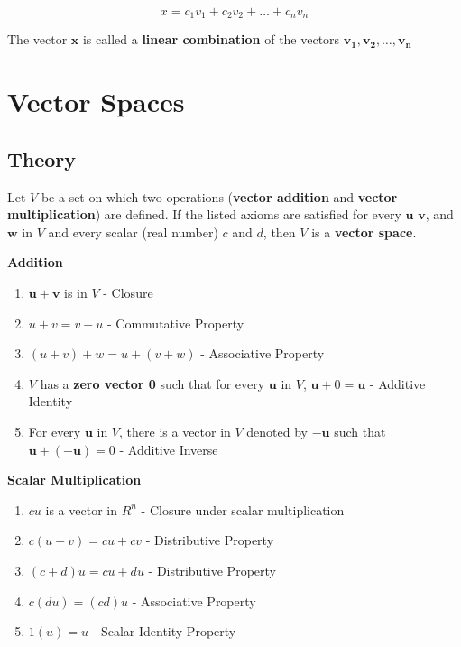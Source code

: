 \documentclass{report}
\begin{document}
$$
x = c_1v_1 + c_2v_2 + \hdots + c_nv_n
$$

\noindent The vector $\bm{x}$ is called a \textbf{linear combination} of the vectors $\bm{v_1},\bm{v_2},\hdots,\bm{v_n}$

\section{Vector Spaces} 

\subsection{Theory}

\begin{tcolorbox}[title = Definition of a Vector Space]
	
Let $V$ be a set on which two operations (\textbf{vector addition} and \textbf{vector multiplication}) are defined. If the listed axioms are satisfied for every $\bm{u}$ $\bm{v}$, and $\bm{w}$ in $V$ and every scalar (real number) $c$ and $d$, then $V$ is a \textbf{vector space}.\\

\end{tcolorbox}

\noindent \textbf{Addition}
\begin{enumerate} 
    \item $\bm{u} + \bm{v}$ is in $V$ - Closure
    \item $u+v=v+u$ - Commutative Property
    \item $(u+v) + w = u + (v+w)$ - Associative Property
    \item $V$ has a \textbf{zero vector 0} such that for every $\bm{u}$ in $V$, $\bm{u}+0=\bm{u}$ - Additive Identity
    \item For every $\bm{u}$ in $V$, there is a vector in $V$ denoted by $-\bm{u}$ such that $\bm{u} + (-\bm{u}) = 0$ - Additive Inverse
\end{enumerate}

\noindent \textbf{Scalar Multiplication}
\begin{enumerate}
    \item $cu$ is a vector in $R^n$ - Closure under scalar multiplication
    \item $c(u+v) = cu + cv$ - Distributive Property
    \item $(c+d)u = cu + du$ - Distributive Property
    \item $c(du) = (cd)u$ - Associative Property
    \item $1(u) = u$ - Scalar Identity Property
\end{enumerate}
\end{document}
